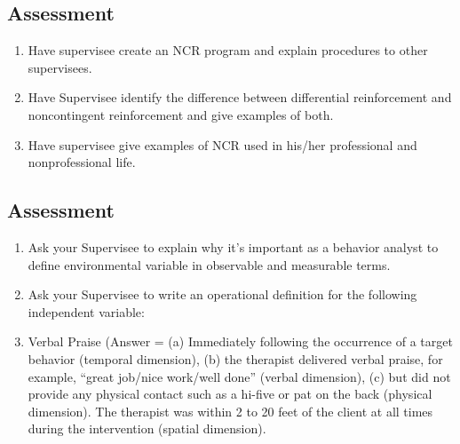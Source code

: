 \subsection{Assessment}
\begin{enumerate}
\item Have supervisee create an NCR program and explain procedures to other supervisees.
\item Have Supervisee identify the difference between differential reinforcement and noncontingent reinforcement and give examples of both.
\item Have supervisee give examples of NCR used in his/her professional and nonprofessional life.
\end{enumerate}
%
\subsection{Assessment}
\begin{enumerate}
\item Ask your Supervisee to explain why it's important as a behavior analyst to define environmental variable in observable and measurable terms. 
\item Ask your Supervisee to write an operational definition for the following independent variable:
\item Verbal Praise (Answer = (a) Immediately following the occurrence of a target behavior (temporal dimension), (b) the therapist delivered verbal praise, for example, ``great job/nice work/well done'' (verbal dimension), (c) but did not provide any physical contact such as a hi-five or pat on the back (physical dimension). The therapist was within 2 to 20 feet of the client at all times during the intervention (spatial dimension).
\end{enumerate}
%
